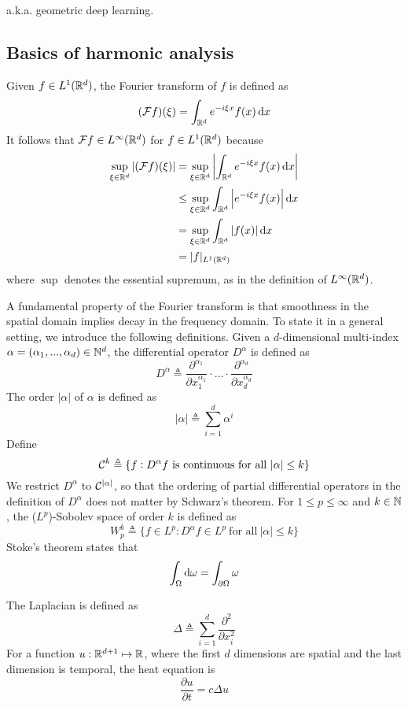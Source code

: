 \documentclass{article}
\newcommand{\pp}[2]{{\frac{\partial {#1}}{\partial {#2}}}}
\begin{document}
a.k.a. geometric deep learning.

\subsection{Basics of harmonic analysis}

Given $f \in L^1 ({\mathbb R}^d)$, the Fourier transform of $f$ is defined as
\[
(\calf f) (\xi) = \int_{\bbr^d} e^{-i \xi x} f(x) \dif x
\]
It follows that ${\mathcal F} f \in L^\infty ({\mathbb R}^d)$ for $f \in L^1 ({\mathbb R}^d)$ because
\begin{align*}
\sup_{\xi \in \bbr^d} |(\calf f) (\xi)|
& = \sup_{\xi \in \bbr^d} \left|\int_{\bbr^d} e^{-i \xi x} f(x) \dif x \right| \\
& \leq \sup_{\xi \in \bbr^d} \int_{\bbr^d} \left|e^{-i \xi x} f(x) \right| \dif x \\
& = \sup_{\xi \in \bbr^d} \int_{\bbr^d} |f(x)| \dif x \\
& = |f|_{L^1 (\bbr^d)}
\end{align*}
where $\sup$ denotes the essential supremum, as in the definition of $L^\infty ({\mathbb R}^d)$.

A fundamental property of the Fourier transform is that smoothness in the spatial domain implies decay in the frequency domain.
To state it in a general setting, we introduce the following definitions.
Given a $d$-dimensional multi-index $\alpha = (\alpha_1, ..., \alpha_d) \in {\mathbb N}^d$, the differential operator $D^\alpha$ is defined as
\[
D^\alpha \triangleq \frac{\partial^{\alpha_1}}{\partial x_1^{\alpha_1}} \cdot \ldots \cdot \frac{\partial^{\alpha_d}}{\partial x_d^{\alpha_d}}
\]
The order $|\alpha|$ of $\alpha$ is defined as
\[
|\alpha| \triangleq \sum_{i = 1}^d \alpha^i
\]
Define
\[
\calc^k \triangleq \{f : D^\alpha f\ \text{is continuous for all}\ |\alpha| \leq k\}
\]
We restrict $D^\alpha$ to ${\mathcal C}^{|\alpha|}$, so that the ordering of partial differential operators in the definition of $D^{\alpha}$ does not matter by Schwarz's theorem.
For $1 \leq p \leq \infty$ and $k \in {\mathbb N}$, the ($L^p$)-Sobolev space of order $k$ is defined as
\[
W_p^k \triangleq \{f \in L^p : D^\alpha f \in L^p\ \text{for all}\ |\alpha| \leq k\}
\]
Stoke's theorem states that
\[
\int_\Omega \dif \omega = \int_{\partial \Omega} \omega
\]

The Laplacian is defined as
\[
\Delta \triangleq \sum_{i = 1}^d \frac{\partial^2}{\partial x_i^2}
\]
For a function $u: {\mathbb R}^{d + 1} \mapsto {\mathbb R}$, where the first $d$ dimensions are spatial and the last dimension is temporal, the heat equation is
\[
\pp{u}{t} = c \Delta u
\]
\end{document}
